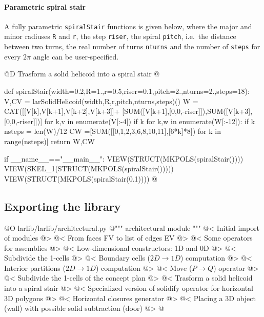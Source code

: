 \documentclass[11pt,oneside]{article}    %
\begin{document}
\paragraph{Parametric spiral stair}

A fully parametric \texttt{spiralStair} functions is given below, where the major and minor radiuses \texttt{R} and \texttt{r}, the step \texttt{riser}, the spiral \texttt{pitch}, i.e.~the distance between two turns, the real number of turns \texttt{nturns} and the number of \texttt{steps} for every $2\pi$ angle can be user-specified.

@D Trasform a solid helicoid into a spiral stair
@{def spiralStair(width=0.2,R=1.,r=0.5,riser=0.1,pitch=2.,nturns=2.,steps=18):
    V,CV = larSolidHelicoid(width,R,r,pitch,nturns,steps)()
    W = CAT([[V[k],V[k+1],V[k+2],V[k+3]]+
        [SUM([V[k+1],[0,0,-riser]]),SUM([V[k+3],[0,0,-riser]])]
        for k,v in enumerate(V[:-4]) if k%
    for k,w in enumerate(W[:-12]):
        if k%
    nsteps = len(W)/12
    CW =[SUM([[0,1,2,3,6,8,10,11],[6*k]*8]) for k in range(nsteps)]
    return W,CW

if __name__=="__main__":
    VIEW(STRUCT(MKPOLS(spiralStair())))
    VIEW(SKEL_1(STRUCT(MKPOLS(spiralStair()))))
    VIEW(STRUCT(MKPOLS(spiralStair(0.1))))
@}

\subsection{Exporting the library}

@O larlib/larlib/architectural.py
@{""" architectural module """
@< Initial import of modules @>
@< From faces FV to list of edges EV @>
@< Some operators for assemblies @>
@< Low-dimensional constructors: 1D and 0D @>
@< Subdivide the 1-cells @>
@< Boundary cells ($2D\to 1D$) computation @>
@< Interior partitions ($2D\to 1D$) computation @>
@< Move ($P\to Q$) operator @>
@< Subdivide the 1-cells of the concept plan @>
@< Trasform a solid helicoid into a spiral stair @>
@< Specialized version of solidify operator for horizontal 3D polygons @>
@< Horizontal closures generator @>
@< Placing a 3D object (wall) with possible solid subtraction (door) @>
@}
\end{document}
